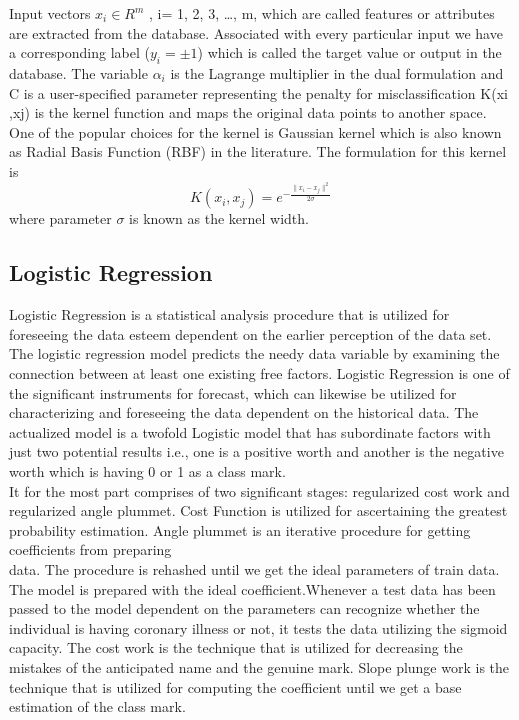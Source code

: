 \documentclass[oneside,12pt]{Classes/VTU}
\begin{document}
    	Input vectors $x_i \in R^m$ , i= 1, 2, 3, …, m, which are called features or attributes are extracted from the database. Associated with every particular input we have a corresponding label ($ y_i = \pm 1$) which is called the target value or output in the database. The variable $\alpha_i$ is the Lagrange multiplier in the dual formulation and C is a user-specified parameter representing the penalty for misclassification K(xi ,xj) is the kernel function and maps the original data points to another space.  One of the popular choices for the kernel is Gaussian kernel which is also known as Radial Basis Function (RBF) in the literature. The formulation for this kernel is
    	\[ K(x_i, x_j) = e^{-\frac{\parallel{x_i - x_j}\parallel^2}{2\sigma}} \]
    	where parameter $\sigma$ is known as the kernel width. 
    	
    	
    	
    	\subsection{Logistic Regression}
    	Logistic Regression is a statistical analysis procedure that is utilized for foreseeing the data esteem dependent on the earlier perception of the data set. The logistic regression model predicts the needy data variable by examining the connection between at least one existing free factors. Logistic Regression is one of the significant instruments for forecast, which can likewise be utilized for characterizing and foreseeing the data dependent on the historical data. The actualized model is a twofold Logistic model that has subordinate factors with just two potential results i.e., one is a positive worth and another is the negative worth which is having 0 or 1 as a class mark.\\ 
    	
    	It for the most part comprises of two significant stages: regularized cost work and regularized angle plummet. Cost Function is utilized for ascertaining the greatest probability estimation. Angle plummet is an iterative procedure for getting coefficients from preparing \\
    	
    	data. The procedure is rehashed until we get the ideal parameters of train data. The model is prepared with the ideal coefficient.Whenever a test data has been passed to the model dependent on the parameters can recognize whether the individual is having coronary illness or not, it tests the data utilizing the sigmoid capacity. The cost work is the technique that is utilized for decreasing the mistakes of the anticipated name and the genuine mark. Slope plunge work is the technique that is utilized for computing the coefficient until we get a base estimation of the class mark.\\
    	
\end{document}
